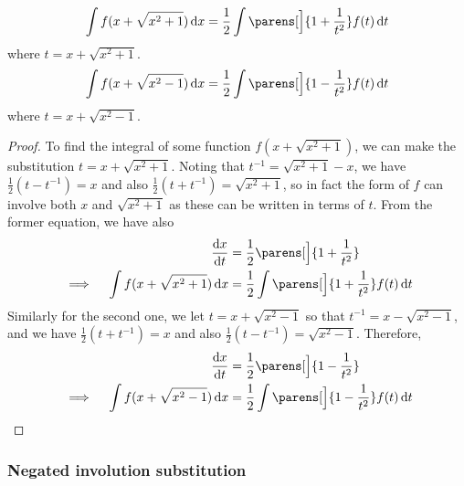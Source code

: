 \begin{theorem}
\begin{equation*}
    \integ{f(x + \sqrt{x^2 + 1})}{x}
    = \frac 12 \integ{\parens[\Big]{1 + \frac 1{t^2}}f(t)}{t}
\end{equation*}
where \(t = x + \sqrt{x^2 + 1}\).
\begin{equation*}
    \integ{f(x + \sqrt{x^2 - 1})}{x}
    = \frac 12 \integ{\parens[\Big]{1 - \frac 1{t^2}}f(t)}{t}
\end{equation*}
where \(t = x + \sqrt{x^2 - 1}\).
\end{theorem}
\begin{proof}
To find the integral of some function \(f(x + \sqrt{x^2 + 1})\), we can make
the substitution \(t = x + \sqrt{x^2 + 1}\). Noting that
\(t^{-1} = \sqrt{x^2 + 1} - x\), we have \(\frac 12(t - t^{-1}) = x\)
and also \(\frac 12(t + t^{-1}) = \sqrt{x^2 + 1}\), so in fact the form of
\(f\) can involve both \(x\) and \(\sqrt{x^2 + 1}\) as these can be
written in terms of \(t\). From the former equation, we have also
\begin{alignat*}{2}
    && \dv<x>{t} &= \frac 12\parens[\Big]{1 + \frac 1{t^2}} \\
    &\implies{}& \integ{f(x + \sqrt{x^2 + 1})}{x}
    &= \frac 12 \integ{\parens[\Big]{1 + \frac 1{t^2}}f(t)}{t}
\end{alignat*}
Similarly for the second one, we let \(t = x + \sqrt{x^2 - 1}\) so that
\(t^{-1} = x - \sqrt{x^2 - 1}\), and we have \(\frac 12(t + t^{-1}) = x\)
and also \(\frac 12(t - t^{-1}) = \sqrt{x^2 - 1}\). Therefore,
\begin{alignat*}{2}
    && \dv<x>{t} &= \frac 12\parens[\Big]{1 - \frac 1{t^2}} \\
    &\implies{}& \integ{f(x + \sqrt{x^2 - 1})}{x}
    &= \frac 12 \integ{\parens[\Big]{1 - \frac 1{t^2}}f(t)}{t} \qedhere
\end{alignat*}
\end{proof}

\subsubsection{Negated involution substitution}

